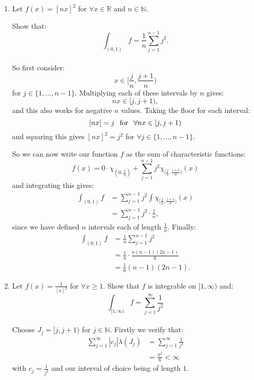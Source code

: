 \begin{enumerate}
    \newpage

    \item Let $f(x)=[nx]^2$ for $\forall x\in\mathbb{R}$ and $n\in\mathbb{N}$.

    Show that:
    $$\int_{(0,1)}f=\frac{1}{n}\sum_{j=1}^{n-1}j^2.$$ \\

    So first consider:
    $$x\in [\frac{j}{n},\frac{j+1}{n})$$
    for $j\in\{1,\dots,n-1\}$. Multiplying each of these intervals by $n$ gives:
    $$nx\in[j,j+1),$$
    and this also works for negative $n$ values. Taking the floor for each interval:
    $$[nx]=j\hspace{0.1in}\text{for}\hspace{0.1in}\forall nx\in[j,j+1)$$
    and squaring this gives $[nx]^2=j^2$ for $\forall j\in\{1,\dots,n-1\}$.

    So we can now write our function $f$ as the sum of characteristic functions:
    $$f(x)=0\cdot\chi_{(0,\frac{j}{n})}+\sum_{j=1}^{n-1}j^2 \chi_{
    [\frac{j}{n},\frac{j+1}{n})}(x)$$
    and integrating this gives:
    \begin{align*}
        \int_{(0,1)}f
        &=\sum_{j=1}^{n-1}j^2\int\chi_{[\frac{j}{n},\frac{j+1}{n})}(x) \\
        &=\sum_{j=1}^{n-1}j^2\cdot\frac{1}{n},
    \end{align*}
    since we have defined $n$ intervals each of length $\frac{1}{n}$. Finally:
    \begin{align*}
        \int_{(0,1)}f
        &=\frac{1}{n}\sum_{j=1}^{n-1}j^2 \\
        &=\frac{1}{n}\cdot\frac{n(n-1)(2n-1)}{6} \\
        &=\frac{1}{6}(n-1)(2n-1).
    \end{align*}

    \newpage

    \item Let $f(x)=\frac{1}{[x]^2}$ for $\forall x\geq1$. Show that $f$ is integrable on $[1,\infty)$ and:
    $$\int_{[1,\infty)}f=\sum_{j=1}^{\infty}\frac{1}{j^2}$$ \\

    Choose $J_j=[j,j+1)$ for $j\in\mathbb{N}$. Firstly we verify that:
    \begin{align*}
        \sum_{j=1}^{\infty}|c_j|\lambda(J_j)
        &=\sum_{j=1}^{\infty}\frac{1}{j^2} \\
        &=\frac{\pi^2}{6}<\infty
    \end{align*}
    with $c_j=\frac{1}{j^2}$ and our interval of choice being of length $1$.


\end{enumerate}
